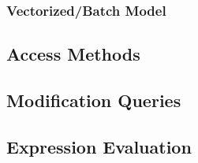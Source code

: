 \documentclass[11pt]{article}
\begin{document}
\subsubsection{Vectorized/Batch Model}
\label{sec:orgb951e28}
\subsection{Access Methods}
\label{sec:org5617ccb}
\subsection{Modification Queries}
\label{sec:orgd4bf422}
\subsection{Expression Evaluation}
\label{sec:org4a97e44}
\end{document}
